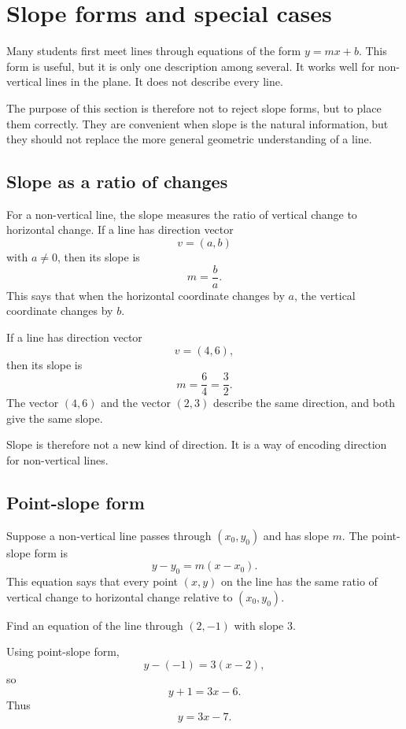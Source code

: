 \section{Slope forms and special cases}

Many students first meet lines through equations of the form \(y=mx+b\). This form is useful, but it is only one description among several. It works well for non-vertical lines in the plane. It does not describe every line.

The purpose of this section is therefore not to reject slope forms, but to place them correctly. They are convenient when slope is the natural information, but they should not replace the more general geometric understanding of a line.

\subsection*{Slope as a ratio of changes}

For a non-vertical line, the slope measures the ratio of vertical change to horizontal change. If a line has direction vector
\[
v=(a,b)
\]
with \(a\ne0\), then its slope is
\[
m=\frac{b}{a}.
\]
This says that when the horizontal coordinate changes by \(a\), the vertical coordinate changes by \(b\).

\begin{examplebox}
If a line has direction vector
\[
v=(4,6),
\]
then its slope is
\[
m=\frac{6}{4}=\frac32.
\]
The vector \((4,6)\) and the vector \((2,3)\) describe the same direction, and both give the same slope.
\end{examplebox}

Slope is therefore not a new kind of direction. It is a way of encoding direction for non-vertical lines.

\subsection*{Point-slope form}

Suppose a non-vertical line passes through \((x_0,y_0)\) and has slope \(m\). The point-slope form is
\[
y-y_0=m(x-x_0).
\]
This equation says that every point \((x,y)\) on the line has the same ratio of vertical change to horizontal change relative to \((x_0,y_0)\).

\begin{examplebox}
Find an equation of the line through \((2,-1)\) with slope \(3\).

Using point-slope form,
\[
y-(-1)=3(x-2),
\]
so
\[
y+1=3x-6.
\]
Thus
\[
y=3x-7.
\]
\end{examplebox}

